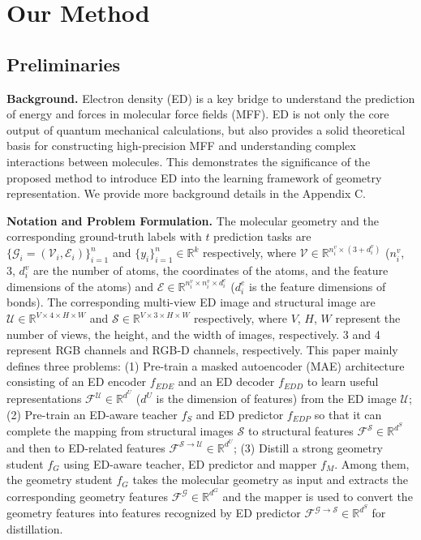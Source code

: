 \documentclass{article}
\begin{document}
\section{Our Method}
\label{OurMethod}

\subsection{Preliminaries}


\textbf{Background.} Electron density (ED) is a key bridge to understand the prediction of energy and forces in molecular force fields (MFF). ED is not only the core output of quantum mechanical calculations, but also provides a solid theoretical basis for constructing high-precision MFF and understanding complex interactions between molecules. This demonstrates the significance of the proposed method to introduce ED into the learning framework of geometry representation. We provide more background details in the Appendix C.


\textbf{Notation and Problem Formulation.} The molecular geometry and the corresponding ground-truth labels with $t$ prediction tasks are $\{\mathcal{G}_i=(\mathcal{V}_i, \mathcal{E}_i)\}_{i=1}^n$ and $\{y_i\}_{i=1}^n\in\mathbb{R}^k$ respectively, where $\mathcal{V}\in\mathbb{R}^{n^v_i\times(3+d_i^v)}$ ($n^v_i$, 3, $d_i^v$ are the number of atoms, the coordinates of the atoms, and the feature dimensions of the atoms) and $\mathcal{E}\in\mathbb{R}^{n^v_i\times n^v_i\times d_i^e}$ ($d_i^e$ is the feature dimensions of bonds). The corresponding multi-view ED image and structural image are $\mathcal{U}\in\mathbb{R}^{V\times 4\times H\times W}$ and $\mathcal{S}\in\mathbb{R}^{V\times 3\times H\times W}$ respectively, where $V$, $H$, $W$ represent the number of views, the height, and the width of images, respectively. 3 and 4 represent RGB channels and RGB-D channels, respectively. This paper mainly defines three problems: (1) Pre-train a masked autoencoder (MAE) \cite{he2022masked} architecture consisting of an ED encoder $f_{EDE}$ and an ED decoder $f_{EDD}$ to learn useful representations $\mathcal{F}^{\mathcal{U}}\in\mathbb{R}^{d^U}$ ($d^U$ is the dimension of features) from the ED image $\mathcal{U}$; (2) Pre-train an ED-aware teacher $f_{S}$ and ED predictor $f_{EDP}$ so that it can complete the mapping from structural images $\mathcal{S}$ to structural features $\mathcal{F}^{\mathcal{S}}\in\mathbb{R}^{d^{S}}$ and then to ED-related features $\mathcal{F}^{\mathcal{S}\rightarrow\mathcal{U}}\in\mathbb{R}^{d^U}$; (3) Distill a strong geometry student $f_{G}$ using ED-aware teacher, ED predictor and mapper $f_M$. Among them, the geometry student $f_{G}$ takes the molecular geometry as input and extracts the corresponding geometry features $\mathcal{F}^{\mathcal{G}}\in\mathbb{R}^{d^{G}}$ and the mapper is used to convert the geometry features into features recognized by ED predictor $\mathcal{F}^{\mathcal{G}\rightarrow\mathcal{S}}\in\mathbb{R}^{d^{S}}$ for distillation.
\end{document}
